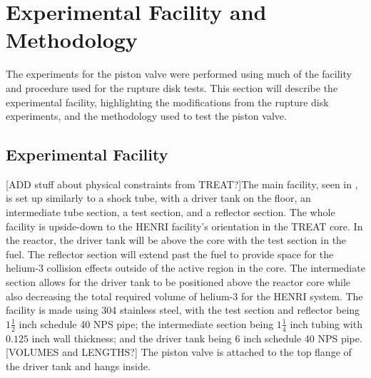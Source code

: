 \section{Experimental Facility and Methodology} \label{s:experiment}

The experiments for the piston valve were performed using much of the facility and procedure used for the rupture disk tests. This section will describe the experimental facility, highlighting the modifications from the rupture disk experiments, and the methodology used to test the piston valve.



\subsection{Experimental Facility} \label{s:facility}

[ADD stuff about physical constraints from TREAT?]The main facility, seen in , is set up similarly to a shock tube, with a driver tank on the floor, an intermediate tube section, a test section, and a reflector section. The whole facility is upside-down to the HENRI facility's orientation in the TREAT core. In the reactor, the driver tank will be above the core with the test section in the fuel. The reflector section will extend past the fuel to provide space for the helium-3 collision effects outside of the active region in the core. The intermediate section allows for the driver tank to be positioned above the reactor core while also decreasing the total required volume of helium-3 for the HENRI system. The facility is made using 304 stainless steel, with the test section and reflector being $1\frac{1}{2}$ inch schedule 40 NPS pipe; the intermediate section being $1\frac{1}{4}$ inch tubing with $0.125$ inch wall thickness; and the driver tank being 6 inch schedule 40 NPS pipe. [VOLUMES and LENGTHS?] The piston valve is attached to the top flange of the driver tank and hangs inside.

